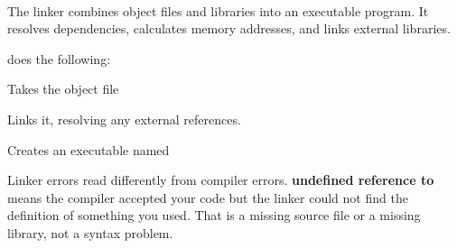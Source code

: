 \documentclass[
    10pt,
    dvipsnames,
    svgnames,
    x11names,
    aspectratio=1610,
    english,
    codeminted]{beamer}
\begin{document}
\begin{frame}[fragile]{\secname}
\framesubtitle{\subsecname}
The linker combines object files and libraries into an executable program. It resolves dependencies, calculates memory addresses, and links external libraries.

\begin{compactitem}
    \item {} does the following:
    \begin{compactitem}
        \item Takes the object file 
        \item Links it, resolving any external references.
        \item Creates an executable named 
        \item {}
    \end{compactitem}
\end{compactitem}

\medskip
\begin{MyBox}
Linker errors read differently from compiler errors. \textbf{undefined reference to} means the compiler accepted your code but the linker could not find the definition of something you used. That is a missing source file or a missing library, not a syntax problem.
\end{MyBox}
\end{frame}

\end{document}
